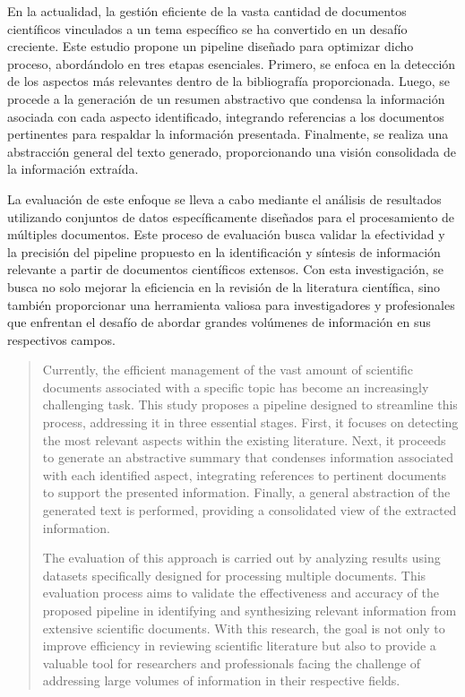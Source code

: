 \begin{resumen}
	En la actualidad, la gestión eficiente de la vasta cantidad de documentos científicos vinculados a un tema específico se ha convertido en un desafío creciente. Este estudio propone un pipeline diseñado para optimizar dicho proceso, abordándolo en tres etapas esenciales. Primero, se enfoca en la detección de los aspectos más relevantes dentro de la bibliografía proporcionada. Luego, se procede a la generación de un resumen abstractivo que condensa la información asociada con cada aspecto identificado, integrando referencias a los documentos pertinentes para respaldar la información presentada. Finalmente, se realiza una abstracción general del texto generado, proporcionando una visión consolidada de la información extraída.

	La evaluación de este enfoque se lleva a cabo mediante el análisis de resultados utilizando conjuntos de datos específicamente diseñados para el procesamiento de múltiples documentos. Este proceso de evaluación busca validar la efectividad y la precisión del pipeline propuesto en la identificación y síntesis de información relevante a partir de documentos científicos extensos. Con esta investigación, se busca no solo mejorar la eficiencia en la revisión de la literatura científica, sino también proporcionar una herramienta valiosa para investigadores y profesionales que enfrentan el desafío de abordar grandes volúmenes de información en sus respectivos campos.
\end{resumen}

\begin{abstract}
	Currently, the efficient management of the vast amount of scientific documents associated with a specific topic has become an increasingly challenging task. This study proposes a pipeline designed to streamline this process, addressing it in three essential stages. First, it focuses on detecting the most relevant aspects within the existing literature. Next, it proceeds to generate an abstractive summary that condenses information associated with each identified aspect, integrating references to pertinent documents to support the presented information. Finally, a general abstraction of the generated text is performed, providing a consolidated view of the extracted information.

	The evaluation of this approach is carried out by analyzing results using datasets specifically designed for processing multiple documents. This evaluation process aims to validate the effectiveness and accuracy of the proposed pipeline in identifying and synthesizing relevant information from extensive scientific documents. With this research, the goal is not only to improve efficiency in reviewing scientific literature but also to provide a valuable tool for researchers and professionals facing the challenge of addressing large volumes of information in their respective fields.
\end{abstract}